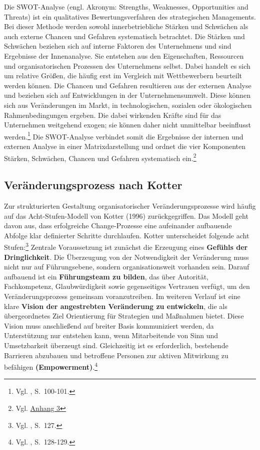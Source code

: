 \documentclass[
    12pt, 
    a4paper,
    ]{scrartcl} %
\begin{document}
Die SWOT-Analyse (engl. Akronym: Strengths, Weaknesses, Opportunities and Threats) ist ein qualitatives Bewertungsverfahren des strategischen Managements. Bei dieser Methode werden sowohl innerbetriebliche Stärken und Schwächen als auch externe Chancen und Gefahren systematisch betrachtet. Die Stärken und Schwächen beziehen sich auf interne Faktoren des Unternehmens und sind Ergebnisse der Innenanalyse. Sie entstehen aus den Eigenschaften, Ressourcen und organisatorischen Prozessen des Unternehmens selbst. Dabei handelt es sich um relative Größen, die häufig erst im Vergleich mit Wettbewerbern beurteilt werden können. Die Chancen und Gefahren resultieren aus der externen Analyse und beziehen sich auf Entwicklungen in der Unternehmensumwelt. Diese können sich aus Veränderungen im Markt, in technologischen, sozialen oder ökologischen Rahmenbedingungen ergeben. Die dabei wirkenden Kräfte sind für das Unternehmen weitgehend exogen; sie können daher nicht unmittelbar beeinflusst werden.\footnote{Vgl. \cite{Koch_Geschaeftsprozessmanagement}, S.~100-101.}
Die SWOT-Analyse verbindet somit die Ergebnisse der internen und externen Analyse in einer Matrixdarstellung und ordnet die vier Komponenten Stärken, Schwächen, Chancen und Gefahren systematisch ein.\footnote{Vgl. \hyperref[sec:Anhang3]{Anhang 3}} 

\subsection{Veränderungsprozess nach Kotter}
Zur strukturierten Gestaltung organisatorischer Veränderungsprozesse wird häufig auf das Acht-Stufen-Modell von Kotter (1996) zurückgegriffen. Das Modell geht davon aus, dass erfolgreiche Change-Prozesse eine aufeinander aufbauende Abfolge klar definierter Schritte durchlaufen. Kotter unterscheidet folgende acht Stufen:\footnote{Vgl. \cite{Rosenstiel_ChangeManagement}, S.~127.} 
Zentrale Voraussetzung ist zunächst die Erzeugung eines \textbf{Gefühls der Dringlichkeit}. Die Überzeugung von der Notwendigkeit der Veränderung muss nicht nur auf Führungsebene, sondern organisationsweit vorhanden sein. Darauf aufbauend ist ein \textbf{Führungsteam zu bilden}, das über Autorität, Fachkompetenz, Glaubwürdigkeit sowie gegenseitiges Vertrauen verfügt, um den Veränderungsprozess gemeinsam voranzutreiben.
Im weiteren Verlauf ist eine klare \textbf{Vision der angestrebten Veränderung zu entwickeln}, die als übergeordnetes Ziel Orientierung für Strategien und Maßnahmen bietet. Diese Vision muss anschließend auf breiter Basis kommuniziert werden, da Unterstützung nur entstehen kann, wenn Mitarbeitende von Sinn und Umsetzbarkeit überzeugt sind. Gleichzeitig ist es erforderlich, bestehende Barrieren abzubauen und betroffene Personen zur aktiven Mitwirkung zu befähigen \textbf{(Empowerment)}.\footnote{Vgl. \cite{Rosenstiel_ChangeManagement}, S.~128-129.} 
\end{document}
